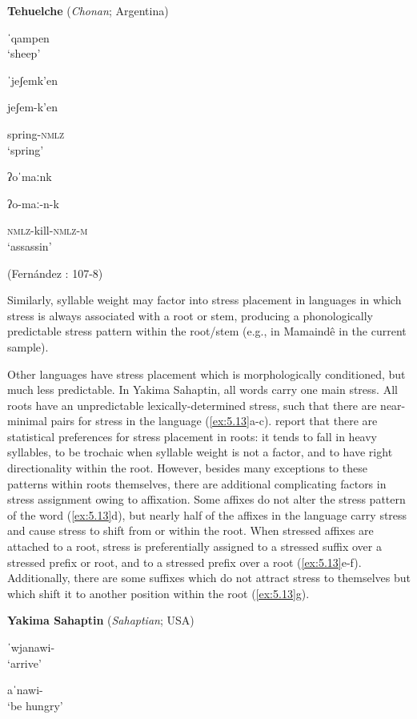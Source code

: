 \ea\label{ex:5.12}
  \textbf{Tehuelche} (\textit{Chonan}; Argentina)

\ea  ˈqampen\\
\glt ‘sheep’

\ex  ˈjeʃemk’en

jeʃem-k’en

spring-\textsc{nmlz}\\
\glt ‘spring’

\ex   ʔoˈmaːnk

ʔo-maː-n-k

\textsc{nmlz}-kill-\textsc{nmlz-m}\\
\glt ‘assassin’

(Fernández \citealt{Garay1998}: 107-8)
\z
\z

Similarly, syllable weight may factor into stress placement in languages in which stress is always associated with a root or stem, producing a phonologically predictable stress pattern within the root/stem (e.g., in Mamaindê in the current sample).

  Other languages have stress placement which is morphologically conditioned, but much less predictable. In Yakima Sahaptin, all words carry one main stress. All roots have an unpredictable lexically-determined stress, such that there are near-minimal pairs for stress in the language (\ref{ex:5.13}a-c). \citet{HargusBeavert2005} report that there are statistical preferences for stress placement in roots: it tends to fall in heavy syllables, to be trochaic when syllable weight is not a factor, and to have right directionality within the root. However, besides many exceptions to these patterns within roots themselves, there are additional complicating factors in stress assignment owing to affixation. Some affixes do not alter the stress pattern of the word (\ref{ex:5.13}d), but nearly half of the affixes in the language carry stress and cause stress to shift from or within the root. When stressed affixes are attached to a root, stress is preferentially assigned to a stressed suffix over a stressed prefix or root, and to a stressed prefix over a root (\ref{ex:5.13}e-f). Additionally, there are some suffixes which do not attract stress to themselves but which shift it to another position within the root (\ref{ex:5.13}g).

\ea\label{ex:5.13}
  \textbf{Yakima Sahaptin} (\textit{Sahaptian}; USA)

\ea  ˈwjanawi-\\
\glt ‘arrive’

\ex  aˈnawi-\\
\glt ‘be hungry’

